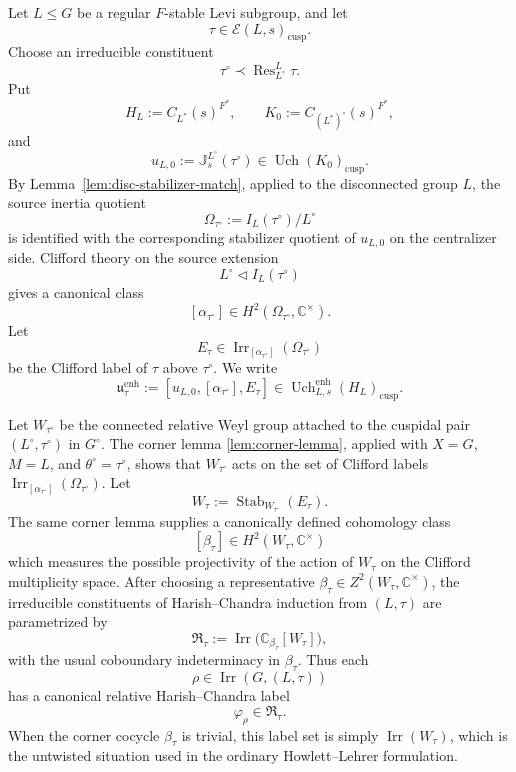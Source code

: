 \documentclass{amsart}
\theoremstyle{plain}
\numberwithin{equation}{section}
\theoremstyle{definition}
\newcommand{\cE}{\mathcal{E}}
\newcommand{\Res}{\operatorname{Res}}
\newcommand{\Irr}{\operatorname{Irr}}
\newcommand{\Uch}{\operatorname{Uch}}
\newcommand{\J}{\mathbb{J}}
\newcommand{\Stab}{\operatorname{Stab}}
\newcommand{\cusp}{\operatorname{cusp}}
\newcommand{\C}{\mathbb{C}}
\begin{document}
Let \(L\leq G\) be a regular \(F\)-stable Levi subgroup, and let
\[
        \tau\in\cE(L,s)_{\cusp}.
\]
Choose an irreducible constituent
\[
        \tau^\circ\prec\Res^L_{L^\circ}\tau .
\]
Put
\[
        H_L:=C_{L^*}(s)^{F^*},
        \qquad
        K_0:=C_{(L^*)^\circ}(s)^{F^*},
\]
and
\[
        u_{L,0}:=\J_{s}^{L^\circ}(\tau^\circ)
        \in \Uch(K_0)_{\cusp}.
\]
By Lemma~\ref{lem:disc-stabilizer-match}, applied to the disconnected group
\(L\), the source inertia quotient
\[
        \Omega_{\tau^\circ}:=I_L(\tau^\circ)/L^\circ
\]
is identified with the corresponding stabilizer quotient of \(u_{L,0}\) on the
centralizer side.  Clifford theory on the source extension
\[
        L^\circ\lhd I_L(\tau^\circ)
\]
gives a canonical class
\[
        [\alpha_{\tau^\circ}]\in H^2(\Omega_{\tau^\circ},\C^\times).
\]
Let
\[
        E_\tau\in\Irr_{[\alpha_{\tau^\circ}]}(\Omega_{\tau^\circ})
\]
be the Clifford label of \(\tau\) above \(\tau^\circ\).  We write
\begin{equation}\label{eq:enh-cuspidal-datum-tau}
        \mathfrak u^{\mathrm{enh}}_\tau
        :=
        [u_{L,0},[\alpha_{\tau^\circ}],E_\tau]
        \in \Uch^{\mathrm{enh}}_{L,s}(H_L)_{\cusp}.
\end{equation}

Let \(W_{\tau^\circ}\) be the connected relative Weyl group attached to the
cuspidal pair \((L^\circ,\tau^\circ)\) in \(G^\circ\).  The corner lemma
\ref{lem:corner-lemma}, applied with \(X=G\), \(M=L\), and
\(\theta^\circ=\tau^\circ\), shows that \(W_{\tau^\circ}\) acts on the set of
Clifford labels \(\Irr_{[\alpha_{\tau^\circ}]}(\Omega_{\tau^\circ})\).  Let
\[
        W_\tau:=\Stab_{W_{\tau^\circ}}(E_\tau).
\]
The same corner lemma supplies a canonically defined cohomology class
\[
        [\beta_\tau]\in H^2(W_\tau,\C^\times)
\]
which measures the possible projectivity of the action of \(W_\tau\) on the
Clifford multiplicity space.  After choosing a representative
\(\beta_\tau\in Z^2(W_\tau,\C^\times)\), the irreducible constituents of
Harish--Chandra induction from \((L,\tau)\) are parametrized by
\[
        \mathfrak R_\tau
        :=
        \Irr\bigl(\C_{\beta_\tau}[W_\tau]\bigr),
\]
with the usual coboundary indeterminacy in \(\beta_\tau\).  Thus each
\[
        \rho\in\Irr(G,(L,\tau))
\]
has a canonical relative Harish--Chandra label
\[
        \varphi_\rho\in\mathfrak R_\tau .
\]
When the corner cocycle \(\beta_\tau\) is trivial, this label set is simply
\(\Irr(W_\tau)\), which is the untwisted situation used in the ordinary
Howlett--Lehrer formulation.
\end{document}
